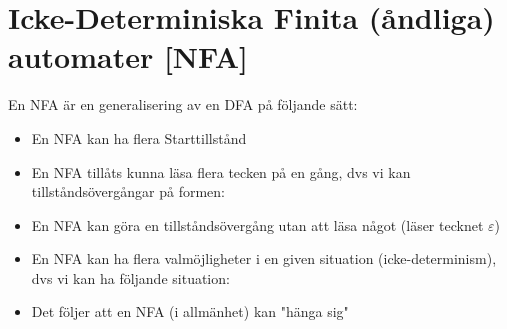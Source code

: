 \section{Icke-Determiniska Finita (åndliga) automater [NFA]}
\par\bigskip
\noindent En NFA är en generalisering av en DFA på följande sätt:\par
\begin{itemize}
  \item En NFA kan ha flera Starttillstånd
  \item En NFA tillåts kunna läsa flera tecken på en gång, dvs vi kan tillståndsövergångar på formen:
\end{itemize}
\begin{figure}[ht]
    \centering
    \caption{}
\end{figure}\par
\begin{itemize}
  \item En NFA kan göra en tillståndsövergång utan att läsa något (läser tecknet $\varepsilon$)
  \item En NFA kan ha flera valmöjligheter i en given situation (icke-determinism), dvs vi kan ha följande situation:
\end{itemize}
\begin{figure}[ht]
    \centering
    \caption{}
\end{figure}\par
\begin{itemize}
  \item Det följer att en NFA (i allmänhet) kan "hänga sig"
\end{itemize}
\par\bigskip
